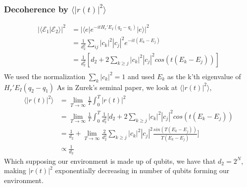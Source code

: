 \documentclass{article}
\begin{document}
\subsubsection{Decoherence by $\langle |r(t)|^2\rangle$}
\begin{align}
    |\langle \mathcal{E}_1|\mathcal{E}_2\rangle|^2&=|\langle e|e^{-itH_r'E_I(q_2-q_1)}|e\rangle|^2\\
    &=\frac{1}{d_2^2}\sum_{ij} |c_k|^2|c_j|^2e^{-it(E_k-E_j)}\\
    &=\frac{1}{d_2^2}[d_2+2\sum_{k\geq j}|c_k|^2|c_j|^2cos(t(E_k-E_j))]\\
\end{align}
We used the normalization $\sum_k|c_k|^2=1$ and used $E_k$ as the k'th eigenvalue of $H_r'E_I(q_2-q_1)$
As in Zurek's seminal paper, we look at $\langle |r(t)|^2\rangle$,
\begin{align}
    \langle |r(t)|^2\rangle &= \lim_{T\rightarrow \infty}\frac{1}{T}\int^{T}_0|r(t)|^2\\
    &=\lim_{T\rightarrow \infty}\frac{1}{T}\int^{T}_0\frac{1}{d_2^2}[d_2+2\sum_{k\geq j}|c_k|^2|c_j|^2cos(t(E_k-E_j))\\
    &=\frac{1}{d_2}+\lim_{T\rightarrow \infty}\frac{2}{d_2^2}\sum_{k\geq j}|c_k|^2|c_j|^2\frac{sin(T(E_k-E_j))}{T(E_k-E_j)}]\\
    &\propto \frac{1}{d_2}
\end{align}
Which supposing our environment is made up of qubits, we have that $d_2=2^N$, making $|r(t)|^2$ exponentially decreasing in number of qubits forming our environment. 
\end{document}
